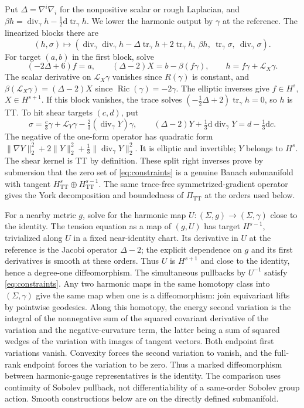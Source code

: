 \documentclass[11pt]{article}
\theoremstyle{remark}
\newcommand{\TT}{\mathrm{TT}}
\newcommand{\Ric}{\operatorname{Ric}}
\newcommand{\tr}{\operatorname{tr}}
\newcommand{\divg}{\operatorname{div}}
\newcommand{\dd}{\mathrm{d}}
\newcommand{\Lie}{\mathcal L}
\begin{document}
Put \(\Delta=\nabla^i\nabla_i\) for the nonpositive scalar or rough Laplacian, and \(\beta h=\divg_\gamma h-\tfrac12\dd\tr_\gamma h\). We lower the harmonic output by \(\gamma\) at the reference. The linearized blocks there are
\[
 (h,\sigma)\longmapsto
 \left(\divg_\gamma\divg_\gamma h-\Delta\tr_\gamma h
                    +2\tr_\gamma h,\ \beta h,\ 
        \tr_\gamma\sigma,\ \divg_\gamma\sigma\right).
\]
For target \((a,b)\) in the first block, solve
\[
 (-2\Delta+6)f=a,\qquad
 (\Delta-2)X=b-\beta(f\gamma),\qquad h=f\gamma+\Lie_X\gamma .
\]
The scalar derivative on \(\Lie_X\gamma\) vanishes since \(R(\gamma)\) is constant, and \(\beta(\Lie_X\gamma)=(\Delta-2)X\) since \(\Ric(\gamma)=-2\gamma\). The elliptic inverses give \(f\in H^s\), \(X\in H^{s+1}\). If this block vanishes, the trace solves \((-\tfrac12\Delta+2)\tr_\gamma h=0\), so \(h\) is TT. To hit shear targets \((c,d)\), put
\[
 \sigma=\tfrac{c}{3}\gamma+\Lie_Y\gamma
               -\tfrac23(\divg_\gamma Y)\gamma,\qquad
 (\Delta-2)Y+\tfrac13\dd\divg_\gamma Y=d-\tfrac13\dd c .
\]
The negative of the one-form operator has quadratic form
\(\|\nabla Y\|_2^2+2\|Y\|_2^2+\tfrac13\|\divg_\gamma Y\|_2^2\). It is elliptic and invertible; \(Y\) belongs to \(H^s\). The shear kernel is TT by definition. These split right inverses prove by submersion that the zero set of \eqref{eq:constraints} is a genuine Banach submanifold with tangent
\(H^s_{\TT}\oplus H^{s-1}_{\TT}\). The same trace-free symmetrized-gradient operator gives the York decomposition and boundedness of \(\Pi_{\TT}\) at the orders used below.

For a nearby metric \(g\), solve for the harmonic map
\(U:(\Sigma,g)\to(\Sigma,\gamma)\) close to the identity. The tension equation as a map of \((g,U)\) has target \(H^{s-1}\), trivialized along \(U\) in a fixed near-identity chart. Its derivative in \(U\) at the reference is the Jacobi operator \(\Delta-2\); the explicit dependence on \(g\) and its first derivatives is smooth at these orders. Thus \(U\) is \(H^{s+1}\) and close to the identity, hence a degree-one diffeomorphism. The simultaneous pullbacks by \(U^{-1}\) satisfy \eqref{eq:constraints}. Any two harmonic maps in the same homotopy class into \((\Sigma,\gamma)\) give the same map when one is a diffeomorphism: join equivariant lifts by pointwise geodesics. Along this homotopy, the energy second variation is the integral of the nonnegative sum of the squared covariant derivative of the variation and the negative-curvature term, the latter being a sum of squared wedges of the variation with images of tangent vectors. Both endpoint first variations vanish. Convexity forces the second variation to vanish, and the full-rank endpoint forces the variation to be zero. Thus a marked diffeomorphism between harmonic-gauge representatives is the identity. The comparison uses continuity of Sobolev pullback, not differentiability of a same-order Sobolev group action. Smooth constructions below are on the directly defined submanifold.
\end{document}
